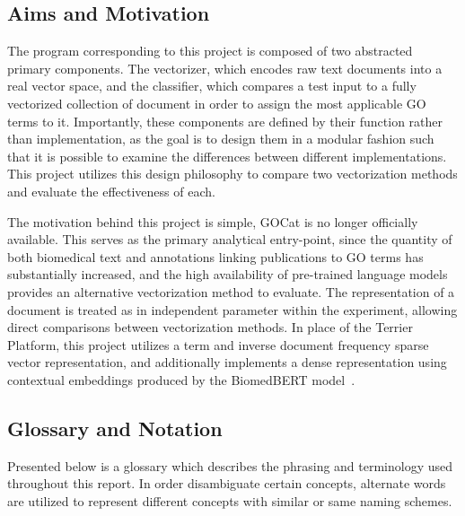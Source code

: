 \documentclass[11pt]{article}
\theoremstyle{plain}
\theoremstyle{definition}
\begin{document}
\subsection{Aims and Motivation}\label{sec:introduction-aims}

The program corresponding to this project is composed of two abstracted primary components. The vectorizer, which encodes raw text documents into a real vector space, and the classifier, which compares a test input to a fully vectorized collection of document in order to assign the most applicable GO terms to it. Importantly, these components are defined by their function rather than implementation, as the goal is to design them in a modular fashion such that it is possible to examine the differences between different implementations. This project utilizes this design philosophy to compare two vectorization methods and evaluate the effectiveness of each.

The motivation behind this project is simple, GOCat is no longer officially available. This serves as the primary analytical entry-point, since the quantity of both biomedical text and annotations linking publications to GO terms has substantially increased, and the high availability of pre-trained language models provides an alternative vectorization method to evaluate. The representation of a document is treated as in independent parameter within the experiment, allowing direct comparisons between vectorization methods. In place of the Terrier Platform, this project utilizes a term and inverse document frequency sparse vector representation, and additionally implements a dense representation using contextual embeddings produced by the BiomedBERT model~\cite{gu/2021/domainspecific}.

\subsection{Glossary and Notation}\label{sec:introduction-glossary}

Presented below is a glossary which describes the phrasing and terminology used throughout this report. In order disambiguate certain concepts, alternate words are utilized to represent different concepts with similar or same naming schemes.
\end{document}
